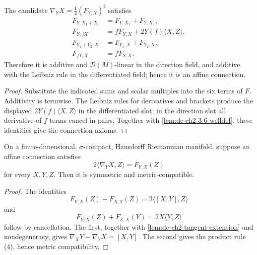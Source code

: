 \begin{lemma}
  \label{lem:dc-ch2-3-6-affine}
  \leanok
  The candidate $\nabla_YX=\frac12(F_{Y,X})^\sharp$ satisfies
  \begin{align*}
    F_{Y,X_1+X_2}&=F_{Y,X_1}+F_{Y,X_2},\\
    F_{Y,fX}&=fF_{Y,X}+2Y(f)\langle X,Z\rangle,\\
    F_{Y_1+Y_2,X}&=F_{Y_1,X}+F_{Y_2,X},\\
    F_{fY,X}&=fF_{Y,X}.
  \end{align*}
  Therefore it is additive and $\mathcal{D}(M)$-linear in the direction field,
  and additive with the Leibniz rule in the differentiated field; hence it is an
  affine connection.
\end{lemma}
\begin{proof}
  \leanok
  \sketch
  Substitute the indicated sums and scalar multiples into the six terms of
  $F$. Additivity is termwise. The Leibniz rules for derivatives and brackets
  produce the displayed $2Y(f)\langle X,Z\rangle$ in the differentiated slot;
  in the direction slot all derivative-of-$f$ terms cancel in pairs. Together
  with \cref{lem:dc-ch2-3-6-welldef}, these identities give the connection
  axioms.
\end{proof}

\begin{lemma}
  \label{lem:dc-ch2-3-6-exist}
  \leanok
  On a finite-dimensional, $\sigma$-compact, Hausdorff Riemannian manifold,
  suppose an affine connection satisfies
  \[
    2\langle\nabla_YX,Z\rangle=F_{Y,X}(Z)
  \]
  for every $X,Y,Z$. Then it is symmetric and metric-compatible.
\end{lemma}
\begin{proof}
  \leanok
  \sketch
  The identities
  \[
    F_{Y,X}(Z)-F_{X,Y}(Z)=2\langle[X,Y],Z\rangle
  \]
  and
  \[
    F_{Y,X}(Z)+F_{Z,X}(Y)=2X\langle Y,Z\rangle
  \]
  follow by cancellation. The first, together with
  \cref{lem:dc-ch2-tangent-extension} and nondegeneracy, gives
  $\nabla_XY-\nabla_YX=[X,Y]$. The second gives the product rule (4), hence
  metric compatibility.
\end{proof}

